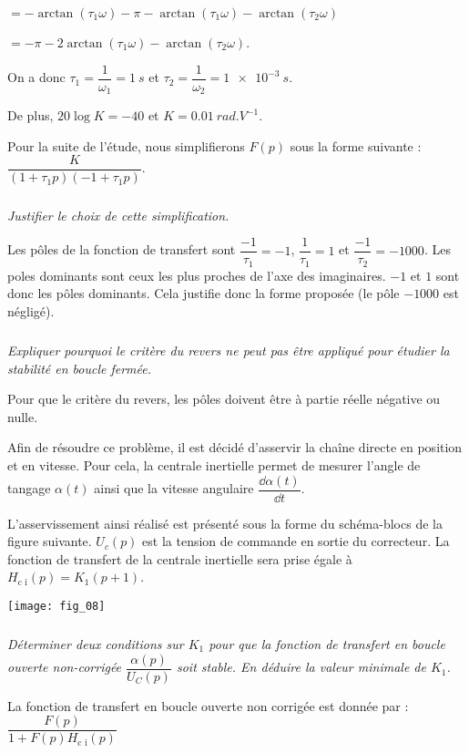 \begin{multicols}{2}
\begin{corrige}
$= -\arctan\left( \tau_1 \omega\right)-\pi -\arctan\left( \tau_1 \omega\right)-\arctan\left( \tau_2 \omega\right)$

 $= -\pi-2\arctan\left( \tau_1 \omega\right)-\arctan\left( \tau_2 \omega\right)$.
 
 On a donc $\tau_1 = \dfrac{1}{\omega_1} = \SI{1}{s}$ et $\tau_2 = \dfrac{1}{\omega_2} = \SI{1e-3}{s}$.
 
 De plus, $20\log K=-40$ et $K=\SI{0,01}{rad.V^{-1}}$.
\end{corrige}
\else
\fi

\ifprof
\else
Pour la suite de l'étude, nous simplifierons $F(p)$ sous la forme suivante : $\dfrac{K}{(1+\tau_1p)(-1+ \tau_1p)}$.
\fi



\subparagraph{} \textit{Justifier le choix de cette simplification.}
\ifprof
\begin{corrige}
Les pôles de la fonction de transfert sont $\dfrac{-1}{\tau_1}=-1$, $\dfrac{1}{\tau_1}=1$ et $\dfrac{-1}{\tau_2}=-1000$. Les poles dominants sont ceux les plus proches de l'axe des imaginaires. $-1$ et $1$ sont donc les pôles dominants. Cela justifie donc la forme proposée (le pôle $-1000$ est négligé).
\end{corrige}
\else
\fi


\subparagraph{} \textit{Expliquer pourquoi le critère du revers ne peut pas être appliqué pour étudier la stabilité en boucle
fermée.}
\ifprof
\begin{corrige}
Pour que le critère du revers, les pôles doivent être à partie réelle négative ou nulle. 
\end{corrige}
\else
\fi


\ifprof
\else
Afin de résoudre ce problème, il est décidé d'asservir la chaîne directe en position et en vitesse. Pour cela, la centrale inertielle permet de mesurer l'angle de tangage $\alpha (t )$ ainsi que la vitesse angulaire $\dfrac{\dd \alpha(t)}{\dd t}$.

L'asservissement ainsi réalisé est présenté sous la forme du schéma-blocs de la figure suivante.
$U_c (p)$ est la tension de commande en sortie du correcteur. La fonction de transfert de la centrale inertielle
sera prise égale à $H_{\text{c i}}(p)=K_1(p+1)$.

\begin{center}
\texttt{[image: fig\_08]}
\end{center}
\fi


\subparagraph{} \textit{Déterminer deux conditions sur $K_1$ pour que la fonction de transfert en boucle ouverte non-corrigée $\dfrac{\alpha (p)}{U_C(p)}$ soit stable. En déduire la valeur minimale de $K_1$.}
\ifprof
\begin{corrige}
La fonction de transfert en boucle ouverte non corrigée est donnée par : $\dfrac{F(p)}{1+F(p)H_{\text{c i}}(p)}$ 


\end{corrige}
\end{multicols}

